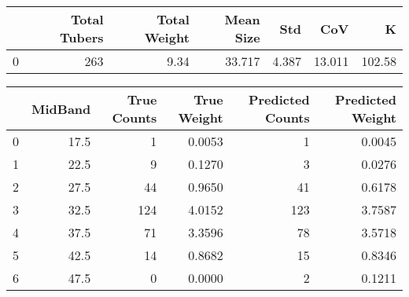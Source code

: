 \begin{tabular}{lrrrrrr}
\toprule
{} &  Total Tubers &  Total Weight &  Mean Size &    Std &     CoV &       K \\
\midrule
0 &           263 &          9.34 &     33.717 &  4.387 &  13.011 &  102.58 \\
\bottomrule
\end{tabular}

\begin{tabular}{lrrrrr}
\toprule
{} &  MidBand &  True Counts &  True Weight &  Predicted Counts &  Predicted Weight \\
\midrule
0 &     17.5 &            1 &       0.0053 &                 1 &            0.0045 \\
1 &     22.5 &            9 &       0.1270 &                 3 &            0.0276 \\
2 &     27.5 &           44 &       0.9650 &                41 &            0.6178 \\
3 &     32.5 &          124 &       4.0152 &               123 &            3.7587 \\
4 &     37.5 &           71 &       3.3596 &                78 &            3.5718 \\
5 &     42.5 &           14 &       0.8682 &                15 &            0.8346 \\
6 &     47.5 &            0 &       0.0000 &                 2 &            0.1211 \\
\bottomrule
\end{tabular}

